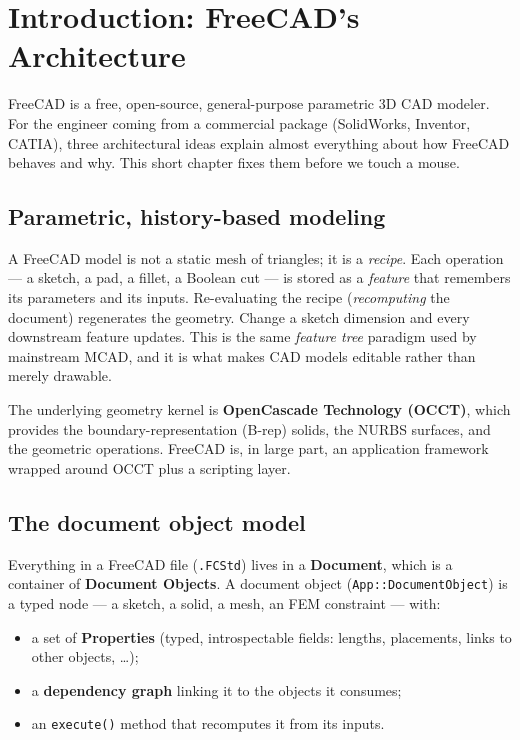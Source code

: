 \chapter{Introduction: FreeCAD's Architecture}
\label{ch:introduction}

FreeCAD is a free, open-source, general-purpose parametric 3D CAD
modeler. For the engineer coming from a commercial package
(SolidWorks, Inventor, CATIA), three architectural ideas explain almost
everything about how FreeCAD behaves and why. This short chapter fixes
them before we touch a mouse.

\section{Parametric, history-based modeling}

A FreeCAD model is not a static mesh of triangles; it is a
\emph{recipe}. Each operation --- a sketch, a pad, a fillet, a Boolean
cut --- is stored as a \emph{feature} that remembers its parameters and
its inputs. Re-evaluating the recipe (\emph{recomputing} the document)
regenerates the geometry. Change a sketch dimension and every downstream
feature updates. This is the same \emph{feature tree} paradigm used by
mainstream MCAD, and it is what makes CAD models editable rather than
merely drawable.

The underlying geometry kernel is \textbf{OpenCascade Technology (OCCT)},
which provides the boundary-representation (B-rep) solids, the NURBS
surfaces, and the geometric operations. FreeCAD is, in large part, an
application framework wrapped around OCCT plus a scripting layer.

\section{The document object model}

Everything in a FreeCAD file (\texttt{.FCStd}) lives in a
\textbf{Document}, which is a container of \textbf{Document Objects}. A
document object (\texttt{App::DocumentObject}) is a typed node --- a
sketch, a solid, a mesh, an FEM constraint --- with:

\begin{itemize}
  \item a set of \textbf{Properties} (typed, introspectable fields:
        lengths, placements, links to other objects, \ldots);
  \item a \textbf{dependency graph} linking it to the objects it consumes;
  \item an \texttt{execute()} method that recomputes it from its inputs.
\end{itemize}

